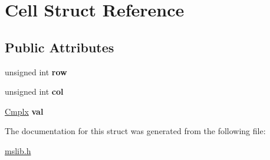 \hypertarget{structCell}{\section{Cell Struct Reference}
\label{structCell}
}
\subsection*{Public Attributes}
\begin{DoxyCompactItemize}
\item 
\hypertarget{structCell_a147aed65e29e05d9541ecf4df7b789b6}{unsigned int {\bfseries row}}\label{structCell_a147aed65e29e05d9541ecf4df7b789b6}

\item 
\hypertarget{structCell_abecc8cfe235cceb980929ae6ab1a29f3}{unsigned int {\bfseries col}}\label{structCell_abecc8cfe235cceb980929ae6ab1a29f3}

\item 
\hypertarget{structCell_a75182f3c8d8ede8cfec3f5e9408ba493}{\hyperlink{structCmplx}{Cmplx} {\bfseries val}}\label{structCell_a75182f3c8d8ede8cfec3f5e9408ba493}

\end{DoxyCompactItemize}


The documentation for this struct was generated from the following file\-:\begin{DoxyCompactItemize}
\item 
\hyperlink{mslib_8h}{mslib.\-h}\end{DoxyCompactItemize}
